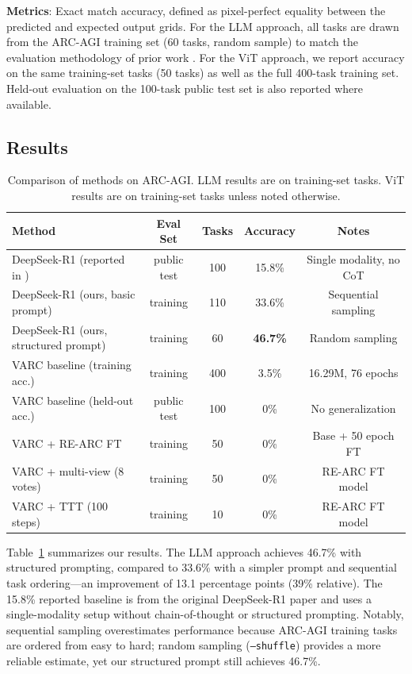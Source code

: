 \documentclass{article}
\begin{document}
\textbf{Metrics}: Exact match accuracy, defined as pixel-perfect equality between the predicted and expected output grids. For the LLM approach, all tasks are drawn from the ARC-AGI training set (60 tasks, random sample) to match the evaluation methodology of prior work \cite{bermansonnet2024,li2025combining}. For the ViT approach, we report accuracy on the same training-set tasks (50 tasks) as well as the full 400-task training set. Held-out evaluation on the 100-task public test set is also reported where available.

\subsection{Results}

\begin{table}[t]
\centering
\caption{Comparison of methods on ARC-AGI. LLM results are on training-set tasks. ViT results are on training-set tasks unless noted otherwise.}
\label{tab:results}
\begin{tabular}{lcccc}
\toprule
Method & Eval Set & Tasks & Accuracy & Notes \\
\midrule
DeepSeek-R1 (reported in \cite{deepseek2025r1}) & public test & 100 & 15.8\% & Single modality, no CoT \\
DeepSeek-R1 (ours, basic prompt) & training & 110 & 33.6\% & Sequential sampling \\
DeepSeek-R1 (ours, structured prompt) & training & 60 & \textbf{46.7\%} & Random sampling \\
\midrule
VARC baseline (training acc.) & training & 400 & 3.5\% & 16.29M, 76 epochs \\
VARC baseline (held-out acc.) & public test & 100 & 0\% & No generalization \\
VARC + RE-ARC FT & training & 50 & 0\% & Base + 50 epoch FT \\
VARC + multi-view (8 votes) & training & 50 & 0\% & RE-ARC FT model \\
VARC + TTT (100 steps) & training & 10 & 0\% & RE-ARC FT model \\
\bottomrule
\end{tabular}
\end{table}

Table~\ref{tab:results} summarizes our results. The LLM approach achieves 46.7\% with structured prompting, compared to 33.6\% with a simpler prompt and sequential task ordering---an improvement of 13.1 percentage points (39\% relative). The 15.8\% reported baseline is from the original DeepSeek-R1 paper \cite{deepseek2025r1} and uses a single-modality setup without chain-of-thought or structured prompting. Notably, sequential sampling overestimates performance because ARC-AGI training tasks are ordered from easy to hard; random sampling (\texttt{--shuffle}) provides a more reliable estimate, yet our structured prompt still achieves 46.7\%.
\end{document}
